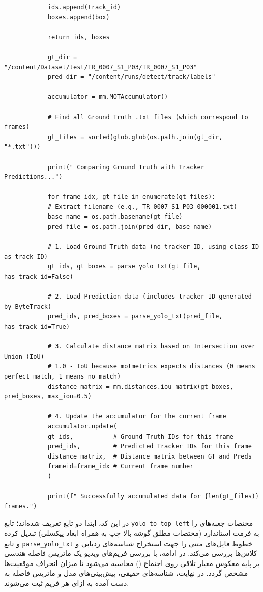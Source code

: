 \documentclass{article}
\begin{document}
\begin{latin}
\begin{LTR}
\begin{verbatim}
			ids.append(track_id)
			boxes.append(box)
			
			return ids, boxes
			
			gt_dir = "/content/Dataset/test/TR_0007_S1_P03/TR_0007_S1_P03"
			pred_dir = "/content/runs/detect/track/labels"
			
			accumulator = mm.MOTAccumulator()
			
			# Find all Ground Truth .txt files (which correspond to frames)
			gt_files = sorted(glob.glob(os.path.join(gt_dir, "*.txt")))
			
			print(" Comparing Ground Truth with Tracker Predictions...")
			
			for frame_idx, gt_file in enumerate(gt_files):
			# Extract filename (e.g., TR_0007_S1_P03_000001.txt)
			base_name = os.path.basename(gt_file)
			pred_file = os.path.join(pred_dir, base_name)
			
			# 1. Load Ground Truth data (no tracker ID, using class ID as track ID)
			gt_ids, gt_boxes = parse_yolo_txt(gt_file, has_track_id=False)
			
			# 2. Load Prediction data (includes tracker ID generated by ByteTrack)
			pred_ids, pred_boxes = parse_yolo_txt(pred_file, has_track_id=True)
			
			# 3. Calculate distance matrix based on Intersection over Union (IoU)
			# 1.0 - IoU because motmetrics expects distances (0 means perfect match, 1 means no match)
			distance_matrix = mm.distances.iou_matrix(gt_boxes, pred_boxes, max_iou=0.5)
			
			# 4. Update the accumulator for the current frame
			accumulator.update(
			gt_ids,           # Ground Truth IDs for this frame
			pred_ids,         # Predicted Tracker IDs for this frame
			distance_matrix,  # Distance matrix between GT and Preds
			frameid=frame_idx # Current frame number
			)
			
			print(f" Successfully accumulated data for {len(gt_files)} frames.")
		\end{verbatim}
	\end{LTR}
\end{latin}

در این کد، ابتدا دو تابع تعریف شده‌اند؛ تابع \texttt{yolo_to_top_left} مختصات جعبه‌های  را به فرمت استاندارد  (مختصات مطلق گوشه بالا-چپ به همراه ابعاد پیکسلی) تبدیل کرده و تابع \texttt{parse_yolo_txt} خطوط فایل‌های متنی را جهت استخراج شناسه‌های ردیابی و کلاس‌ها بررسی می‌کند. در ادامه، با بررسی فریم‌های ویدیو یک ماتریس فاصله هندسی بر پایه معکوس معیار تلاقی روی اجتماع () محاسبه می‌شود تا میزان انحراف موقعیت‌ها مشخص گردد. در نهایت، شناسه‌های حقیقی، پیش‌بینی‌های مدل و ماتریس فاصله به دست آمده به ازای هر فریم ثبت می‌شوند.
\end{document}
